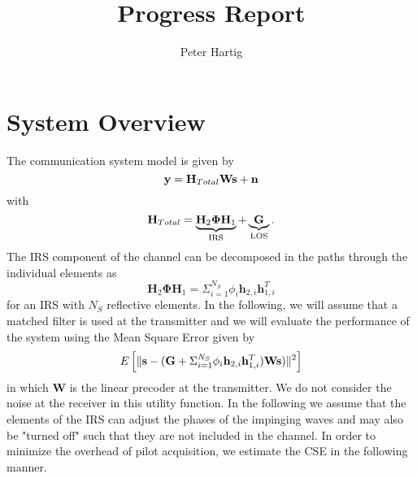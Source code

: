 \documentclass[12pt,a4paper]{report}
\title{Progress Report}
\author{Peter Hartig}
\begin{document}
\maketitle
\tableofcontents
\section{System Overview}
The communication system model is given by 
\begin{equation}
\mathbf{y} = \mathbf{H}_{Total} \mathbf{W} \mathbf{s}  + \mathbf{n}
\end{equation}
with 
	\begin{equation*}
	\mathbf{H}_{Total} = \underbrace{\mathbf{H}_{2}\boldsymbol{\Phi}\mathbf{H}_{1}}_{\text{IRS}} + \underbrace{\mathbf{G}}_{\text{LOS}}.
	\end{equation*}
	The IRS component of the channel can be decomposed in the paths through the individual elements as
	\begin{equation}
	\mathbf{H}_{2}\boldsymbol{\Phi}\mathbf{H}_{1}= 
	\Sigma_{i=1}^{N_S} \phi_i \mathbf{h}_{2,i}\mathbf{h}^T_{1,i}
	\end{equation}
	for an IRS with $N_S$ reflective elements. 
In the following, we will assume that a matched filter is used at the transmitter and we will evaluate the performance of the system using the Mean Square Error given by 
\begin{equation}
E\left[\|  \mathbf{s} - (\mathbf{G} + \Sigma_{i=1}^{N_S} \phi_i \mathbf{h}_{2,i}\mathbf{h}^T_{1,i})\mathbf{W}\mathbf{s}) \|^2 \right]
\end{equation}
in which $\mathbf{W}$ is the linear precoder at the transmitter. We do not consider the noise at the receiver in this utility function. 
In the following we assume that the elements of the IRS can adjust the phases of the impinging waves and may also be "turned off" such that they are not included in the channel.
In order to minimize the overhead of pilot acquisition, we estimate the CSE in the following manner. 
\end{document}
